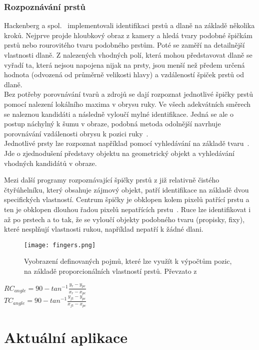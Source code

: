\subsubsection{Rozpoznávání prstů}
Hackenberg a spol.~\cite{12} implementovali identifikaci prstů a dlaně na základě několika kroků. Nejprve projde hloubkový obraz z kamery a hledá tvary podobné špičkám prstů nebo rourovitého tvaru podobného prstům. Poté se zaměří na detailnější vlastnosti dlaně. Z nalezených vhodných polí, která mohou představovat dlaně se vyřadí ta, která nejsou napojena nijak na prsty, jsou menší než předem určená hodnota (odvozená od průměrně velikosti hlavy) a vzdáleností špiček prstů od dlaně.\\


Bez potřeby porovnávání tvarů a zdrojů se dají rozpoznat jednotlivé špičky prstů pomocí nalezení lokálního maxima v obrysu ruky. Ve všech adekvátních směrech se naleznou kandidáti a následně vyloučí mylné identifikace. Jedná se ale o postup náchylný k šumu v obraze, podobná metoda odolnější navrhuje porovnávání vzdálenosti obrysu k pozici ruky~\cite{3}.\\
Jednotlivé prsty lze rozpoznat například pomocí vyhledávání na základě tvaru~\cite{4}. Jde o zjednodušení představy objektu na geometrický objekt a vyhledávání vhodných kandidátů v obraze. 

Mezi další programy rozpoznávající špičky prstů z již relativně čistého čtyřúhelníku, který obsahuje zájmový objekt, patří identifikace na základě dvou specifických vlastností. Centrum špičky je obklopen kolem pixelů patřící prstu a ten je obklopen dlouhou řadou pixelů nepatřících prstu~\cite{14}. Ruce lze identifikovat i až po prstech a to tak, že se vyloučí objekty podobného tvaru (propisky, fixy), které nesplňují vlastnosti rukou, například nepatří k žádné dlani.

\begin{figure}[h]
\centering
\texttt{[image: fingers.png]}
\caption{Vyobrazení definovaných pojmů, které lze využít k výpočtům pozic, na základě proporcionálních vlastností prstů.
Převzato z ~\cite{13} }
\label{pic8}
\end{figure}
\begin{center}
$RC_{angle} = 90 - tan^{-1} \frac{y_{r}-y_{pc}}{x_{r} - x_{pc}}$ \\
$TC_{angle} = 90 - tan^{-1} \frac{y_{ft}-y_{pc}}{x_{ft} - x_{pc}}$ 
\end{center}
\newpage
\section{Aktuální aplikace}
